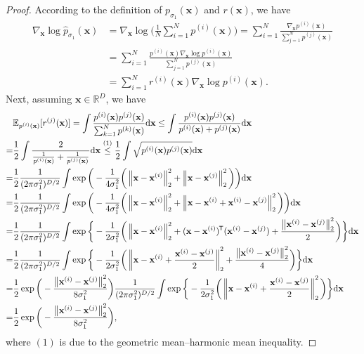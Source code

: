 \documentclass{article}
\newcommand*{\tran}{^{\mkern-1.5mu\mathsf{T}}}
\newcommand{\mbb}[1]{\mathbb{#1}}
\newcommand{\ud}{\mathrm{d}}
\newcommand{\norm}[1]{\left\lVert#1\right\rVert}
\newcommand{\bfx}{\mathbf{x}}
\begin{document}
\begin{proof}
According to the definition of $p_{\sigma_1}(\bfx)$ and $r(\bfx)$, we have
\begin{align*}
    \nabla_\bfx \log \hat{p}_{\sigma_1}(\bfx) &= \nabla_\bfx \log \bigg( \frac{1}{N} \sum_{i=1}^N p^{(i)}(\bfx) \bigg)
    = \sum_{i=1}^N \frac{\nabla_\bfx p^{(i)}(\bfx)}{\sum_{j=1}^N p^{(j)}(\bfx)}\\
    &= \sum_{i=1}^N \frac{p^{(i)}(\bfx) \nabla_\bfx \log p^{(i)}(\bfx)}{\sum_{j=1}^N p^{(j)}(\bfx)} \\
    &= \sum_{i=1}^N r^{(i)}(\bfx) \nabla_\bfx \log p^{(i)}(\bfx).
\end{align*}
Next, assuming $\bfx \in \mbb{R}^D$, we have
\begin{align*}
    &\mbb{E}_{p^{(i)}(\bfx)}[r^{(j)}(\bfx)] = \int \frac{p^{(i)}(\bfx)p^{(j)}(\bfx)}{\sum_{k=1}^N p^{(k)}(\bfx)} \ud \bfx \leq \int \frac{p^{(i)}(\bfx)p^{(j)}(\bfx)}{p^{(i)}(\bfx) + p^{(j)}(\bfx)} \ud \bfx \\
    =& \frac{1}{2} \int \frac{2}{\frac{1}{p^{(i)}(\bfx)} + \frac{1}{p^{(j)}(\bfx)}} \ud \bfx \stackrel{(1)}{\leq} \frac{1}{2} \int \sqrt{p^{(i)}(\bfx) p^{(j)}(\bfx)} \ud \bfx\\
    =& \frac{1}{2} \frac{1}{(2\pi \sigma_1^2)^{D/2}} \int \exp \bigg(-\frac{1}{4\sigma_1^2}\bigg(\norm{\bfx - \bfx^{(i)}}_2^2 + \norm{\bfx - \bfx^{(j)}}_2^2\bigg) \bigg) \ud \bfx\\
    =& \frac{1}{2} \frac{1}{(2\pi \sigma_1^2)^{D/2}} \int \exp \bigg(-\frac{1}{4\sigma_1^2}\bigg(\norm{\bfx - \bfx^{(i)}}_2^2 + \norm{\bfx - \bfx^{(i)} + \bfx^{(i)} - \bfx^{(j)}}_2^2\bigg) \bigg) \ud \bfx\\
    =& \frac{1}{2} \frac{1}{(2\pi \sigma_1^2)^{D/2}} \int \exp \bigg\{-\frac{1}{2\sigma_1^2}\bigg(\norm{\bfx - \bfx^{(i)}}_2^2 + (\bfx - \bfx^{(i)})\tran (\bfx^{(i)} - \bfx^{(j)}) + \frac{\norm{\bfx^{(i)} - \bfx^{(j)}}_2^2}{2}\bigg) \bigg\} \ud \bfx\\
    =& \frac{1}{2} \frac{1}{(2\pi \sigma_1^2)^{D/2}} \int \exp \bigg\{-\frac{1}{2\sigma_1^2}\bigg(\norm{\bfx - \bfx^{(i)} + \frac{\bfx^{(i)} - \bfx^{(j)}}{2}}_2^2 + \frac{\norm{\bfx^{(i)} - \bfx^{(j)}}_2^2}{4}\bigg) \bigg\} \ud \bfx\\
    =& \frac{1}{2}\exp\bigg(-\frac{\norm{\bfx^{(i)} - \bfx^{(j)}}_2^2}{8\sigma_1^2}\bigg) \frac{1}{(2\pi \sigma_1^2)^{D/2}} \int \exp \bigg\{-\frac{1}{2\sigma_1^2}\bigg(\norm{\bfx - \bfx^{(i)} + \frac{\bfx^{(i)} - \bfx^{(j)}}{2}}_2^2\bigg) \bigg\} \ud \bfx\\
    =& \frac{1}{2}\exp\bigg(-\frac{\norm{\bfx^{(i)} - \bfx^{(j)}}_2^2}{8\sigma_1^2}\bigg),
\end{align*}
where $(1)$ is due to the geometric mean--harmonic mean inequality.
\end{proof}
\end{document}
